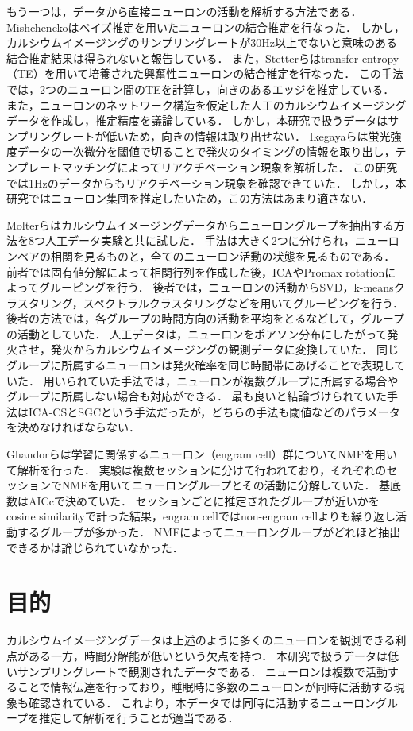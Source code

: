 もう一つは，データから直接ニューロンの活動を解析する方法である．
Mishchenckoはベイズ推定を用いたニューロンの結合推定を行なった\cite{Mishchencko2011}．
しかし，カルシウムイメージングのサンプリングレートが30Hz以上でないと意味のある結合推定結果は得られないと報告している．
また，Stetterらはtransfer entropy（TE）を用いて培養された興奮性ニューロンの結合推定を行なった\cite{Stetter2012}．
この手法では，2つのニューロン間のTEを計算し，向きのあるエッジを推定している．
また，ニューロンのネットワーク構造を仮定した人工のカルシウムイメージングデータを作成し，推定精度を議論している．
しかし，本研究で扱うデータはサンプリングレートが低いため，向きの情報は取り出せない．
Ikegayaらは蛍光強度データの一次微分を閾値で切ることで発火のタイミングの情報を取り出し，テンプレートマッチングによってリアクチベーション現象を解析した\cite{Ikegaya2004}．
この研究では1Hzのデータからもリアクチベーション現象を確認できていた．
しかし，本研究ではニューロン集団を推定したいため，この方法はあまり適さない．

Molterらはカルシウムイメージングデータからニューロングループを抽出する方法を8つ人工データ実験と共に試した\cite{Molter2018}．
手法は大きく2つに分けられ，ニューロンペアの相関を見るものと，全てのニューロン活動の状態を見るものである．
前者では固有値分解によって相関行列を作成した後，ICAやPromax rotationによってグルーピングを行う．
後者では，ニューロンの活動からSVD，k-meansクラスタリング，スペクトラルクラスタリングなどを用いてグルーピングを行う．
後者の方法では，各グループの時間方向の活動を平均をとるなどして，グループの活動としていた．
人工データは，ニューロンをポアソン分布にしたがって発火させ，発火からカルシウムイメージングの観測データに変換していた．
同じグループに所属するニューロンは発火確率を同じ時間帯にあげることで表現していた．
用いられていた手法では，ニューロンが複数グループに所属する場合やグループに所属しない場合も対応ができる．
最も良いと結論づけられていた手法はICA-CSとSGCという手法だったが，どちらの手法も閾値などのパラメータを決めなければならない．

Ghandorらは学習に関係するニューロン（engram cell）群についてNMFを用いて解析を行った\cite{Ghandour2019}．
実験は複数セッションに分けて行われており，それぞれのセッションでNMFを用いてニューロングループとその活動に分解していた．
基底数はAICcで決めていた．
セッションごとに推定されたグループが近いかをcosine similarityで計った結果，engram cellではnon-engram cellよりも繰り返し活動するグループが多かった．
NMFによってニューロングループがどれほど抽出できるかは論じられていなかった．

\section{目的}
カルシウムイメージングデータは上述のように多くのニューロンを観測できる利点がある一方，時間分解能が低いという欠点を持つ．
本研究で扱うデータは低いサンプリングレートで観測されたデータである．
ニューロンは複数で活動することで情報伝達を行っており，睡眠時に多数のニューロンが同時に活動する現象も確認されている．
これより，本データでは同時に活動するニューロングループを推定して解析を行うことが適当である．

